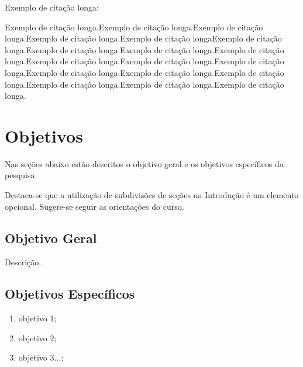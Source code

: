 Exemplo de citação longa: 

\begin{citacao}
Exemplo de citação longa.Exemplo de citação longa.Exemplo de citação longa.Exemplo de citação longa.Exemplo de citação longaExemplo de citação longa.Exemplo de citação longa.Exemplo de citação longa.Exemplo de citação longa.Exemplo de citação longa.Exemplo de citação longa.Exemplo de citação longa.Exemplo de citação longa.Exemplo de citação longa.Exemplo de citação longa.Exemplo de citação longa.Exemplo de citação longa.Exemplo de citação longa.
\end{citacao}

\section{Objetivos}
Nas seções abaixo estão descritos o objetivo geral e os objetivos específicos da pesquisa.

Destaca-se que a utilização de subdivisões de seções na Introdução é um elemento opcional. Sugere-se seguir as orientações do curso. 
\subsection{Objetivo Geral}
Descrição.


\subsection{Objetivos Específicos}

\begin{enumerate}[label=\alph*)]
    \item objetivo 1;
    \item objetivo 2;
    \item objetivo 3...;
\end{enumerate}